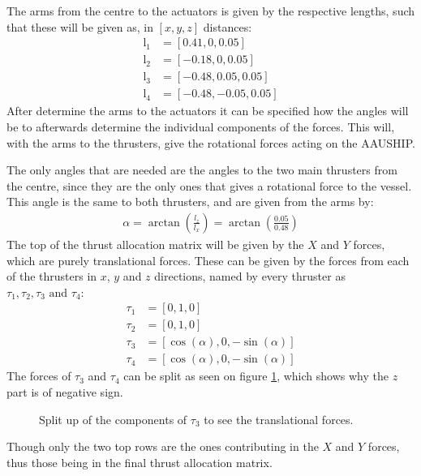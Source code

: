 The arms from the centre to the actuators is given by the respective lengths, such that these will be given as, in $[x, y, z]$ distances:
\begin{align}
\text{l}_1 &= [0.41, 0, 0.05]\\
\text{l}_2 &= [-0.18, 0, 0.05]\\
\text{l}_3 &= [-0.48, 0.05, 0.05]\\
\text{l}_4 &= [-0.48, -0.05, 0.05]
\end{align}
After determine the arms to the actuators it can be specified how the angles will be to afterwards determine the individual components of the forces. This will, with the arms to the thrusters, give the rotational forces acting on the AAUSHIP.

The only angles that are needed are the angles to the two main thrusters from the centre, since they are the only ones that gives a rotational force to the vessel. This angle is the same to both thrusters, and are given from the arms by:
\begin{align}
\alpha = \arctan\left(\frac{l_z}{l_x}\right) = \arctan\left(\frac{0.05}{0.48}\right)
\end{align}
The top of the thrust allocation matrix will be given by the $X$ and $Y$ forces, which are purely translational forces. These can be given by the forces from each of the thrusters in $x$, $y$ and $z$ directions, named by every thruster as $\tau_1, \tau_2, \tau_3 \text{ and } \tau_4$:
\begin{align}
\tau_1 &= [0, 1, 0] \\
\tau_2 &= [0, 1, 0] \\
\tau_3 &= [\cos(\alpha), 0, -\sin(\alpha)] \\
\tau_4 &= [\cos(\alpha), 0, -\sin(\alpha)] 
\end{align}
The forces of $\tau_3$ and $\tau_4$ can be split as seen on figure \ref{fig:f3vector}, which shows why the $z$ part is of negative sign.
\begin{figure}[htbp]
	\centering
	
	\caption{Split up of the components of $\tau_3$ to see the translational forces.}
	\label{fig:f3vector}
\end{figure}
Though only the two top rows are the ones contributing in the $X$ and $Y$ forces, thus those being in the final thrust allocation matrix.


